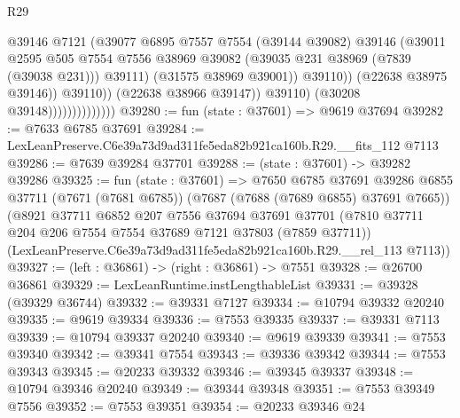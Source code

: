 \begin{lexlean}{R29}
\begin{coremodule}
                                            @39146
                                            @7121
                                            (@39077
                                              @6895
                                              @7557
                                              @7554
                                              (@39144 @39082)
                                              @39146
                                              (@39011
                                                @2595
                                                @505
                                                @7554
                                                @7556
                                                @38969
                                                @39082
                                                (@39035 @231 @38969 (@7839 (@39038 @231)))
                                                @39111)
                                              (@31575 @38969 @39001))
                                            @39110))
                                        (@22638 @38975 @39146))
                                      @39110))
                                  (@22638 @38966 @39147))
                                @39110)
                              (@30208 @39148))))))))))))))
@39280 := fun (state : @37601) => @9619 @37694
@39282 := @7633 @6785 @37691
@39284 := LexLeanPreserve.C6e39a73d9ad311fe5eda82b921ca160b.R29.__fits_112 @7113
@39286 := @7639 @39284 @37701
@39288 := (state : @37601) -> @39282 @39286
@39325 := fun (state : @37601) =>
  @7650
    @6785
    @37691
    @39286
    @6855
    @37711
    (@7671 (@7681 @6785))
    (@7687 (@7688 (@7689 @6855) @37691 @7665))
    (@8921
      @37711
      @6852
      @207
      @7556
      @37694
      @37691
      @37701
      (@7810 @37711 @204 @206 @7554 @7554 @37689 @7121 @37803 (@7859 @37711))
      (LexLeanPreserve.C6e39a73d9ad311fe5eda82b921ca160b.R29.__rel_113 @7113))
@39327 := (left : @36861) -> (right : @36861) -> @7551
@39328 := @26700 @36861
@39329 := LexLeanRuntime.instLengthableList
@39331 := @39328 (@39329 @36744)
@39332 := @39331 @7127
@39334 := @10794 @39332 @20240
@39335 := @9619 @39334
@39336 := @7553 @39335
@39337 := @39331 @7113
@39339 := @10794 @39337 @20240
@39340 := @9619 @39339
@39341 := @7553 @39340
@39342 := @39341 @7554
@39343 := @39336 @39342
@39344 := @7553 @39343
@39345 := @20233 @39332
@39346 := @39345 @39337
@39348 := @10794 @39346 @20240
@39349 := @39344 @39348
@39351 := @7553 @39349 @7556
@39352 := @7553 @39351
@39354 := @20233 @39346 @24

\end{coremodule}
\end{lexlean}
